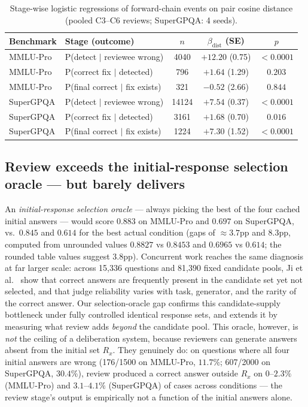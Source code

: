 \documentclass[11pt]{article}
\begin{document}
\begin{table}[t]
\centering
\small
\caption{Stage-wise logistic regressions of forward-chain events on pair cosine distance (pooled C3--C6 reviews; SuperGPQA: 4 seeds).}
\label{tab:stage-reg}
\begin{tabular}{llccc}
\toprule
Benchmark & Stage (outcome) & $n$ & $\beta_{\mathrm{dist}}$ (SE) & $p$ \\
\midrule
MMLU-Pro & P(detect $\mid$ reviewee wrong)        & 4040 & $+12.20$ (0.75) & $<0.0001$ \\
MMLU-Pro & P(correct fix $\mid$ detected)         & 796  & $+1.64$ (1.29)  & $0.203$ \\
MMLU-Pro & P(final correct $\mid$ fix exists)     & 321  & $-0.52$ (2.66)  & $0.844$ \\
\midrule
SuperGPQA & P(detect $\mid$ reviewee wrong)       & 14124 & $+7.54$ (0.37) & $<0.0001$ \\
SuperGPQA & P(correct fix $\mid$ detected)        & 3161  & $+1.68$ (0.70) & $0.016$ \\
SuperGPQA & P(final correct $\mid$ fix exists)    & 1224  & $+7.30$ (1.52) & $<0.0001$ \\
\bottomrule
\end{tabular}
\end{table}

\subsection{Review exceeds the initial-response selection oracle --- but barely delivers}
\label{sec:oracle}

An \emph{initial-response selection oracle} --- always picking the best of the four cached initial answers --- would score $0.883$ on MMLU-Pro and $0.697$ on SuperGPQA, vs.\ $0.845$ and $0.614$ for the best actual condition (gaps of ${\approx}3.7$pp and $8.3$pp, computed from unrounded values $0.8827$ vs $0.8453$ and $0.6965$ vs $0.614$; the rounded table values suggest $3.8$pp). Concurrent work reaches the same diagnosis at far larger scale: across 15{,}336 questions and 81{,}390 fixed candidate pools, Ji et al.\ \cite{ji2026candidate} show that correct answers are frequently present in the candidate set yet not selected, and that judge reliability varies with task, generator, and the rarity of the correct answer. Our selection-oracle gap confirms this candidate-supply bottleneck under fully controlled identical response sets, and extends it by measuring what review adds \emph{beyond} the candidate pool. This oracle, however, is \emph{not} the ceiling of a deliberation system, because reviewers can generate answers absent from the initial set $R_x$. They genuinely do: on questions where all four initial answers are wrong (176/1500 on MMLU-Pro, $11.7\%$; 607/2000 on SuperGPQA, $30.4\%$), review produced a correct answer outside $R_x$ on $0$--$2.3\%$ (MMLU-Pro) and $3.1$--$4.1\%$ (SuperGPQA) of cases across conditions --- the review stage's output is empirically not a function of the initial answers alone.
\end{document}
